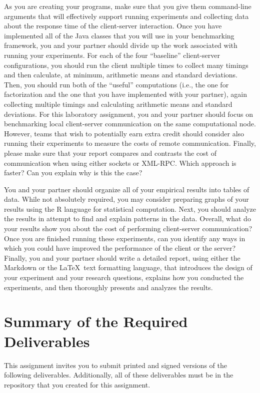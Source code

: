 As you are creating your programs, make sure that you give them command-line arguments that will effectively support
running experiments and collecting data about the response time of the client-server interaction. Once you have
implemented all of the Java classes that you will use in your benchmarking framework, you and your partner should divide
up the work associated with running your experiments. For each of the four ``baseline'' client-server configurations,
you should run the client multiple times to collect many timings and then calculate, at minimum, arithmetic means and
standard deviations. Then, you should run both of the ``useful'' computations (i.e., the one for factorization and the
one that you have implemented with your partner), again collecting multiple timings and calculating arithmetic means and
standard deviations. For this laboratory assignment, you and your partner should focus on benchmarking local
client-server communication on the same computational node. However, teams that wish to potentially earn extra credit
should consider also running their experiments to measure the costs of remote communication. Finally, please make sure
that your report compares and contrasts the cost of communication when using either sockets or XML-RPC. Which approach
is faster? Can you explain why is this the case?

You and your partner should organize all of your empirical results into tables of data. While not absolutely required,
you may consider preparing graphs of your results using the R language for statistical computation. Next, you should
analyze the results in attempt to find and explain patterns in the data. Overall, what do your results show you about
the cost of performing client-server communication? Once you are finished running these experiments, can you identify
any ways in which you could have improved the performance of the client or the server? Finally, you and your partner
should write a detailed report, using either the Markdown or the \LaTeX~text formatting language, that introduces the
design of your experiment and your research questions, explains how you conducted the experiments, and then thoroughly
presents and analyzes the results.

\section*{Summary of the Required Deliverables}

This assignment invites you to submit printed and signed versions of the following deliverables. Additionally,
all of these deliverables must be in the repository that you created for this assignment.

